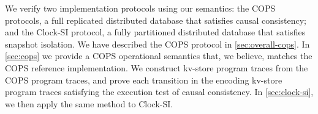 We verify two implementation protocols using our semantics:
the COPS protocols, 
a full replicated distributed database that satisfies causal consistency;
and the Clock-SI protocol, 
a fully partitioned distributed database that satisfies snapshot isolation.
We have described the COPS protocol in \cref{sec:overall-cops}.
In \cref{sec:cops}
we provide a COPS operational semantics that, we believe, matches the COPS reference implementation.
We construct kv-store program traces from the COPS program traces,
and prove each transition in the encoding kv-store program traces satisfying
the execution test of causal consistency.
In \cref{sec:clock-si},
we then apply the same method to Clock-SI.
